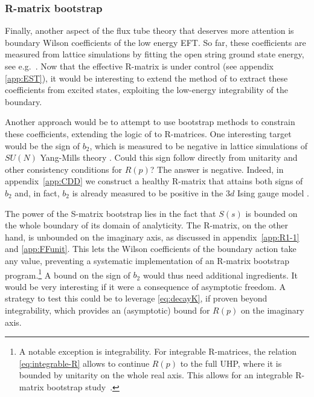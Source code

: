 \documentclass[
 reprint,
 amsmath,
 pre,
 amssymb,
 nofootinbib,
 aps,
 longbibliography,
]{revtex4-1}
\newcommand{\<}{{\langle}}
\renewcommand{\>}{{\rangle}}
\begin{document}
\vspace{-15pt}
\subsubsection*{R-matrix bootstrap}
\vspace{-5pt}
Finally, another aspect of the flux tube theory that deserves more attention is boundary Wilson coefficients of the low energy EFT. So far, these coefficients are measured from lattice simulations by fitting the open string ground state energy, see e.g.\ \cite{Brandt:2010bw,Billo:2012da,Brandt:2018fft,Brandt:2021kvt,Sharifian:2025fyl}. Now that the effective R-matrix is under control (see appendix \ref{app:EST}), it would be interesting to extend the method of \cite{Dubovsky:2013gi,Dubovsky:2014fma} to extract these coefficients from excited states, exploiting the low-energy integrability of the boundary.

Another approach would be to attempt to use bootstrap methods to constrain these coefficients, extending the logic of \cite{EliasMiro:2019kyf,EliasMiro:2021nul,Gaikwad:2023hof,Guerrieri:2024ckc} to R-matrices. One interesting target would be the sign of $b_2$, which is measured to be negative in lattice simulations of $SU(N)$ Yang-Mills theory \cite{Brandt:2018fft}. Could this sign follow directly from unitarity and other consistency conditions for $R(p)$? The answer is negative. Indeed, in appendix~\ref{app:CDD} we construct a healthy R-matrix that attains both signs of $b_2$ and, in fact, $b_2$ is already measured to be positive in the $3d$ Ising gauge model \cite{Billo:2012da,Caselle:2013dra}.

The power of the S-matrix bootstrap lies in the fact that $S(s)$ is bounded on the whole boundary of its domain of analyticity. The R-matrix, on the other hand, is unbounded on the imaginary axis, as discussed in appendix~\ref{app:R1-1} and \ref{app:FFunit}. This lets the Wilson coefficients of the boundary action take any value, preventing a systematic implementation of an R-matrix bootstrap program.\footnote{A notable exception is integrability. For integrable R-matrices, the relation \eqref{eq:integrable-R} allows to continue $R(p)$ to the full UHP, where it is bounded by unitarity on the whole real axis. This allows for an integrable R-matrix bootstrap study~\cite{Kruczenski:2020ujw}.} A bound on the sign of $b_2$ would thus need additional ingredients.
It would be very interesting if it were a consequence of asymptotic freedom. A strategy to test this could be to leverage \eqref{eq:decayK}, if proven beyond integrability, which provides an (asymptotic) bound for $R(p)$ on the imaginary axis.
\end{document}

